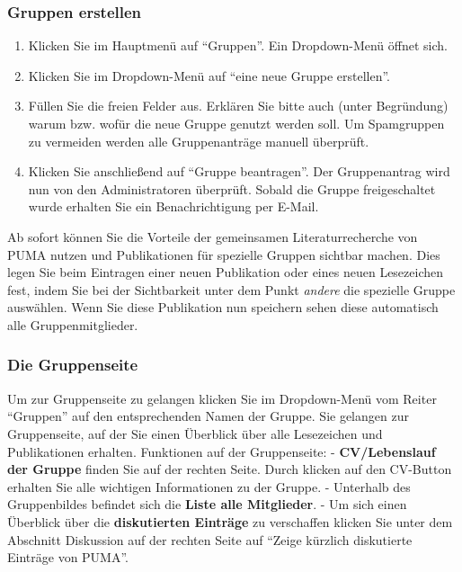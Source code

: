 \documentclass[b5paper,11pt,twoside]{scrbook} %
\begin{document}
\subsubsection{Gruppen erstellen}
\begin{enumerate}
    \item Klicken Sie im Hauptmenü auf \enquote{Gruppen}. Ein Dropdown-Menü öffnet sich.
    \item Klicken Sie im Dropdown-Menü auf \enquote{eine neue Gruppe erstellen}.
    \item Füllen Sie die freien Felder aus. Erklären Sie bitte auch (unter Begründung) warum bzw. wofür die neue Gruppe genutzt werden soll.   Um Spamgruppen zu vermeiden werden alle Gruppenanträge manuell überprüft. 
    \item Klicken Sie anschließend auf \enquote{Gruppe beantragen}. Der Gruppenantrag wird nun von den Administratoren überprüft. Sobald die Gruppe freigeschaltet wurde erhalten Sie ein Benachrichtigung per E-Mail.
\end{enumerate}
Ab sofort können Sie die Vorteile der gemeinsamen Literaturrecherche von PUMA nutzen und Publikationen  für spezielle Gruppen sichtbar machen. Dies legen Sie beim Eintragen einer neuen Publikation oder eines neuen Lesezeichen fest, indem Sie bei der Sichtbarkeit unter dem Punkt \textit{andere} die spezielle Gruppe auswählen. Wenn Sie diese Publikation nun speichern sehen diese automatisch alle Gruppenmitglieder.
\subsubsection{Die Gruppenseite}
Um zur Gruppenseite zu gelangen klicken Sie im Dropdown-Menü vom Reiter  \enquote{Gruppen} auf den entsprechenden Namen der Gruppe. Sie gelangen zur Gruppenseite, auf der Sie einen Überblick über alle Lesezeichen und Publikationen erhalten.%
\newline\newline
Funktionen auf der Gruppenseite:\newline\newline
- \textbf{CV/Lebenslauf der Gruppe} finden Sie auf der rechten Seite. Durch klicken auf den CV-Button erhalten Sie alle wichtigen Informationen zu der Gruppe. \newline \newline - Unterhalb des Gruppenbildes befindet sich die \textbf{Liste alle Mitglieder}. \newline \newline - Um sich einen Überblick über die \textbf{diskutierten Einträge} zu verschaffen klicken Sie unter dem Abschnitt Diskussion auf der rechten Seite auf \enquote{Zeige kürzlich diskutierte Einträge von PUMA}.  
\end{document}
